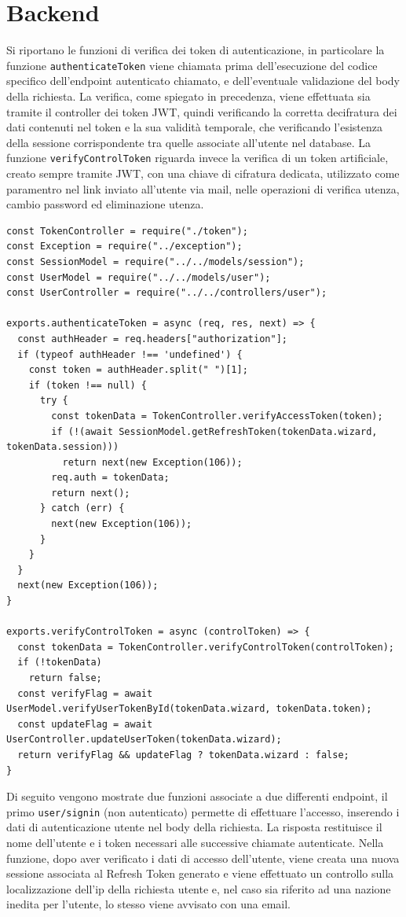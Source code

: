 \documentclass[a4paper]{report}
\begin{document}
\section{Backend}
Si riportano le funzioni di verifica dei token di autenticazione, in particolare la funzione \texttt{authenticateToken} viene chiamata prima dell'esecuzione del codice specifico dell'endpoint autenticato chiamato, e dell'eventuale validazione del body della richiesta. La verifica, come spiegato in precedenza, viene effettuata sia tramite il controller dei token JWT, quindi verificando la corretta decifratura dei dati contenuti nel token e la sua validità temporale, che verificando l'esistenza della sessione corrispondente tra quelle associate all'utente nel database.
La funzione \texttt{verifyControlToken} riguarda invece la verifica di un token artificiale, creato sempre tramite JWT, con una chiave di cifratura dedicata, utilizzato come paramentro nel link inviato all'utente via mail, nelle operazioni di verifica utenza, cambio password ed eliminazione utenza.
\begin{verbatim}
const TokenController = require("./token");
const Exception = require("../exception");
const SessionModel = require("../../models/session");
const UserModel = require("../../models/user");
const UserController = require("../../controllers/user");

exports.authenticateToken = async (req, res, next) => {
  const authHeader = req.headers["authorization"];
  if (typeof authHeader !== 'undefined') {
    const token = authHeader.split(" ")[1];
    if (token !== null) {
      try {
        const tokenData = TokenController.verifyAccessToken(token);
        if (!(await SessionModel.getRefreshToken(tokenData.wizard, tokenData.session)))
          return next(new Exception(106));
        req.auth = tokenData;
        return next();
      } catch (err) {
        next(new Exception(106));
      }
    }
  }
  next(new Exception(106));
}

exports.verifyControlToken = async (controlToken) => {
  const tokenData = TokenController.verifyControlToken(controlToken);
  if (!tokenData)
    return false;
  const verifyFlag = await UserModel.verifyUserTokenById(tokenData.wizard, tokenData.token);
  const updateFlag = await UserController.updateUserToken(tokenData.wizard);
  return verifyFlag && updateFlag ? tokenData.wizard : false;
}
\end{verbatim}
Di seguito vengono mostrate due funzioni associate a due differenti endpoint, il primo \texttt{user/signin} (non autenticato) permette di effettuare l'accesso, inserendo i dati di autenticazione utente nel body della richiesta. La risposta restituisce il nome dell'utente e i token necessari alle successive chiamate autenticate. Nella funzione, dopo aver verificato i dati di accesso dell'utente, viene creata una nuova sessione associata al Refresh Token generato e viene effettuato un controllo sulla localizzazione dell'ip della richiesta utente e, nel caso sia riferito ad una nazione inedita per l'utente, lo stesso viene avvisato con una email.
\end{document}

